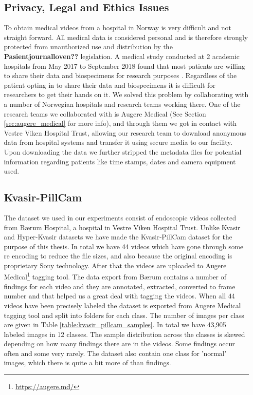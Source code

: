 \documentclass[thesis.tex]{subfiles}
\begin{document}
\subsection{Privacy, Legal and Ethics Issues}
To obtain medical videos from a hospital in Norway is very difficult and not straight forward. All medical data is considered personal and is therefore strongly protected from unauthorized use and distribution by the \textbf{Pasientjournalloven??} legislation.
A medical study conducted at 2 academic hospitals from May 2017 to September 2018 found that most patients are willing to share their data and biospecimens for research purposes \cite{PatientPerspectives19}. Regardless of the patient opting in to share their data and biospecimens it is difficult for researchers to get their hands on it. 
We solved this problem by collaborating with a number of Norwegian hospitals and research teams working there. One of the research teams we collaborated with is Augere Medical (See Section \ref{sec:augere_medical} for more info), and through them we got in contact with Vestre Viken Hospital Trust, allowing our research team to download anonymous data from hospital systems and transfer it using secure media to our facility. Upon downloading the data we further stripped the metadata files for potential information regarding patients like time stamps, dates and camera equipment used.



\subsection{Kvasir-PillCam} \label{sec:kvasir_pillcam}
The dataset we used in our experiments consist of endoscopic videos collected from Bærum Hospital, a hospital in Vestre Viken Hospital Trust. Unlike Kvasir and Hyper-Kvasir datasets we have made the Kvasir-PillCam dataset for the purpose of this thesis. In total we have 44 videos which have gone through some re encoding to reduce the file sizes, and also because the original encoding is proprietary Sony technology. After that the videos are uploaded to Augere Medical\footnote{\url{https://augere.md/}} tagging tool. The data export from Bærum contains a number of  findings for each video and they are annotated, extracted, converted to frame number and that helped us a great deal with tagging the videos. %
When all 44 videos have been precisely labeled the dataset is exported from Augere Medical tagging tool and split into folders for each class. The number of images per class are given in Table \ref{table:kvasir_pillcam_samples}. In total we have 43,905 labeled images in 12 classes. The sample distribution across the classes is skewed depending on how many findings there are in the videos. Some findings occur often and some very rarely. The dataset also contain one class for 'normal' images, which there is quite a bit more of than findings.
\end{document}
